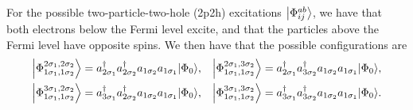 For the possible two-particle-two-hole (2p2h) excitations $\ket*{\Phi_{ij}^{ab}}$, we have that both electrons below the Fermi level excite, and that the particles above the Fermi level have opposite spins.
We then have that the possible configurations are
\begin{align*}
    \ket*{\Phi_{1\sigma_1, 1\sigma_2}^{2\sigma_1, 2\sigma_2}} &= a_{2\sigma_1}^\dagger a_{2\sigma_2}^\dagger a_{1\sigma_2} a_{1\sigma_1} \ket*{\Phi_0}, &
    \ket*{\Phi_{1\sigma_1, 1\sigma_2}^{2\sigma_1, 3\sigma_2}} &= a_{2\sigma_1}^\dagger a_{3\sigma_2}^\dagger a_{1\sigma_2} a_{1\sigma_1} \ket*{\Phi_0}, \\
    \ket*{\Phi_{1\sigma_1, 1\sigma_2}^{3\sigma_1, 2\sigma_2}} &= a_{3\sigma_1}^\dagger a_{2\sigma_2}^\dagger a_{1\sigma_2} a_{1\sigma_1} \ket*{\Phi_0}, &
    \ket*{\Phi_{1\sigma_1, 1\sigma_2}^{3\sigma_1, 3\sigma_2}} &= a_{3\sigma_1}^\dagger a_{3\sigma_2}^\dagger a_{1\sigma_2} a_{1\sigma_1} \ket*{\Phi_0}.
\end{align*}

